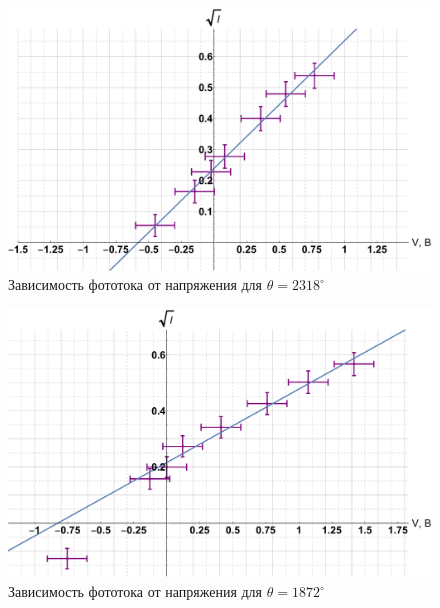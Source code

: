 \documentclass[12pt]{kiarticle}
\begin{document}
\begin{figure}[h!]
	\includegraphics[scale=0.5]{2318.pdf}
	\caption{Зависимость фототока от напряжения для $ \theta = 2318^\circ $}
	\label{graf 2318}
\end{figure} 
	
	\begin{figure}[h!]
		\includegraphics[scale=0.5]{1872.pdf}
		\caption{Зависимость фототока от напряжения для $ \theta = 1872^\circ $}
		\label{graf 1872}
	\end{figure} 
\end{document}
